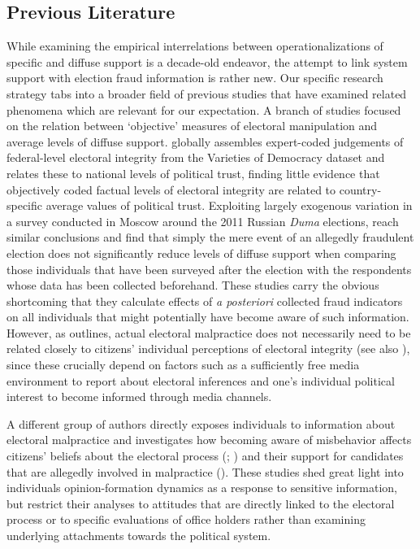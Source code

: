 \documentclass[11pt, ngerman,english,a4]{article}
\begin{document}
\subsection*{Previous Literature}
While examining the empirical interrelations between operationalizations of specific and diffuse support is a decade-old endeavor, the attempt to link system support with election fraud information is rather new. Our specific research strategy tabs into a broader field of previous studies that have examined related phenomena which are relevant for our expectation. A branch of studies focused on the relation between `objective’ measures of electoral manipulation and average levels of diffuse support. \citet{Mauk2019} globally assembles expert-coded judgements of federal-level electoral integrity from the Varieties of Democracy dataset and relates these to national levels of political trust, finding little evidence that objectively coded factual levels of electoral integrity are related to country-specific average values of political trust. Exploiting largely exogenous variation in a survey conducted in Moscow around the 2011 Russian \textit{Duma} elections, \citet{Frye2019} reach similar conclusions and find that simply the mere event of an allegedly fraudulent election does not significantly reduce levels of diffuse support when comparing those individuals that have been surveyed after the election with the respondents whose data has been collected beforehand. These studies carry the obvious shortcoming that they calculate effects of \textit{a posteriori} collected fraud indicators on all individuals that might potentially have become aware of such information. However, as \citet{Mauk2019} outlines, actual electoral malpractice does not necessarily need to be related closely to citizens’ individual perceptions of electoral integrity (see also \citealt{VanHam2015}), since these crucially depend on factors such as a sufficiently free media environment to report about electoral inferences and one's individual political interest to become informed through media channels. 

A different group of authors directly exposes individuals to information about electoral malpractice and investigates how becoming aware of misbehavior affects citizens’ beliefs about the electoral process (\citealt{Robertson2017};  \citealt{Bush2018}) and their support for candidates that are allegedly involved in malpractice (\citealt{Reuter2019}). These studies shed great light into individuals opinion-formation dynamics as a response to sensitive information, but restrict their analyses to attitudes that are directly linked to the electoral process or to specific evaluations of office holders rather than examining underlying attachments towards the political system.    
\end{document}
